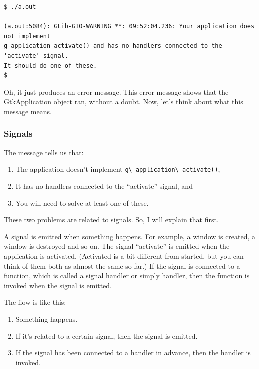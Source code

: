 \begin{lstlisting}
$ ./a.out

(a.out:5084): GLib-GIO-WARNING **: 09:52:04.236: Your application does not implement
g_application_activate() and has no handlers connected to the 'activate' signal.
It should do one of these.
$
\end{lstlisting}

Oh, it just produces an error message. This error message shows that the
GtkApplication object ran, without a doubt. Now, let's think about what
this message means.

\subsubsection{Signals}\label{signals}

The message tells us that:

\begin{enumerate}
\def\labelenumi{\arabic{enumi}.}
\tightlist
\item
  The application doesn't implement
  \passthrough{\lstinline!g\_application\_activate()!},
\item
  It has no handlers connected to the ``activate'' signal, and
\item
  You will need to solve at least one of these.
\end{enumerate}

These two problems are related to signals. So, I will explain that
first.

A signal is emitted when something happens. For example, a window is
created, a window is destroyed and so on. The signal ``activate'' is
emitted when the application is activated. (Activated is a bit different
from started, but you can think of them both as almost the same so far.)
If the signal is connected to a function, which is called a signal
handler or simply handler, then the function is invoked when the signal
is emitted.

The flow is like this:

\begin{enumerate}
\def\labelenumi{\arabic{enumi}.}
\tightlist
\item
  Something happens.
\item
  If it's related to a certain signal, then the signal is emitted.
\item
  If the signal has been connected to a handler in advance, then the
  handler is invoked.
\end{enumerate}

